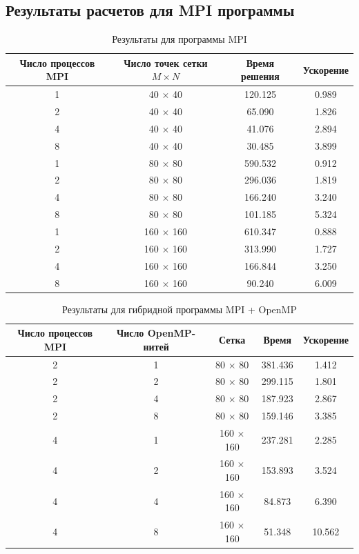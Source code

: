 \documentclass[oneside,final,14pt]{extreport}
\begin{document}
\newpage
\subsection{Результаты расчетов для MPI программы}
\begin{table}[ht]
\begin{tabular}{|c|c|c|c|}
\hline
Число процессов MPI & Число точек сетки \(M \times N\) &
Время решения & Ускорение \\
\hline
1 & 40 \(\times\) 40 & 120.125 & 0.989 \\
2 & 40 \(\times\) 40 & 65.090  & 1.826 \\
4 & 40 \(\times\) 40 & 41.076  & 2.894 \\
8 & 40 \(\times\) 40 & 30.485  & 3.899 \\
\hline
1 & 80 \(\times\) 80 & 590.532 & 0.912 \\
2 & 80 \(\times\) 80 & 296.036 & 1.819 \\
4 & 80 \(\times\) 80 & 166.240 & 3.240 \\
8 & 80 \(\times\) 80 & 101.185 & 5.324 \\
\hline
1 & 160 \(\times\) 160 & 610.347 & 0.888 \\
2 & 160 \(\times\) 160 & 313.990 & 1.727 \\
4 & 160 \(\times\) 160 & 166.844 & 3.250 \\
8 & 160 \(\times\) 160 & 90.240  & 6.009 \\
\hline
\end{tabular}
\caption{Результаты для программы MPI}
\label{tab3}
\end{table}

\begin{table}[h!]
\begin{tabular}{|c|c|c|c|c|}
\hline
Число процессов MPI & Число OpenMP-нитей & Сетка & Время & Ускорение \\
\hline
2 & 1 & 80 \(\times\) 80 & 381.436 & 1.412 \\
2 & 2 & 80 \(\times\) 80 & 299.115 & 1.801 \\
2 & 4 & 80 \(\times\) 80 & 187.923 & 2.867 \\
2 & 8 & 80 \(\times\) 80 & 159.146 & 3.385 \\
\hline
4 & 1 & 160 \(\times\) 160 & 237.281 & 2.285  \\
4 & 2 & 160 \(\times\) 160 & 153.893 & 3.524  \\
4 & 4 & 160 \(\times\) 160 & 84.873  & 6.390  \\
4 & 8 & 160 \(\times\) 160 & 51.348  & 10.562 \\
\hline
\end{tabular}
\caption{Результаты для гибридной программы MPI + OpenMP}
\label{tab4}
\end{table}
\end{document}
